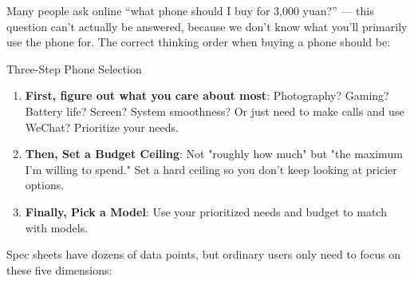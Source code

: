 


Many people ask online “what phone should I buy for 3,000 yuan?” — this question can't actually be answered, because we don't know what you'll primarily use the phone for. The correct thinking order when buying a phone should be:

\begin{tcbinfo}{Three-Step Phone Selection}
\begin{enumerate}
  \item \textbf{First, figure out what you care about most}: Photography? Gaming? Battery life? Screen? System smoothness? Or just need to make calls and use WeChat? Prioritize your needs.
  \item \textbf{Then, Set a Budget Ceiling}: Not "roughly how much" but "the maximum I'm willing to spend." Set a hard ceiling so you don't keep looking at pricier options.
  \item \textbf{Finally, Pick a Model}: Use your prioritized needs and budget to match with models.
\end{enumerate}

\end{tcbinfo}


Spec sheets have dozens of data points, but ordinary users only need to focus on these five dimensions:

